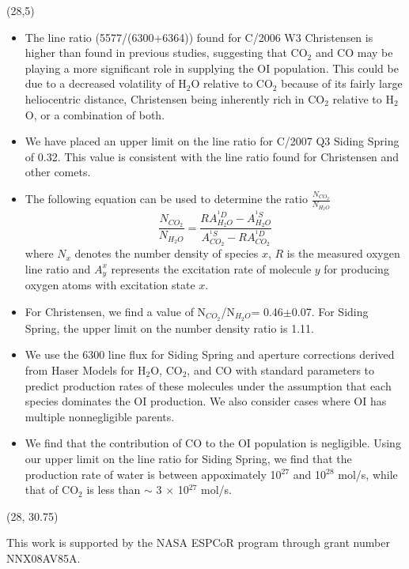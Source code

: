 \documentclass[a0]{a0poster}
\def\SecTitle#1{\noindent{\veryHuge\color{Green} #1}}
\begin{document}
\begin{textblock}{12}(28,5)
\center
\SecTitle{Results}\\
\bigskip
\raggedright
\normalsize
{
\begin{itemize}
\item The line ratio (5577/(6300+6364)) found for C/2006 W3 Christensen is higher than found in previous studies, suggesting that CO$_2$ and CO may be playing a more significant role in supplying the OI population.  This could be due to a decreased volatility of H$_2$O relative to CO$_2$ because of its fairly large heliocentric distance, Christensen being inherently rich in CO$_2$ relative to H$_2$O, or a combination of both.
\item We have placed an upper limit on the line ratio for C/2007 Q3 Siding Spring of 0.32.  This value is consistent with the line ratio found for Christensen and other comets.
\item The following equation can be used to determine the ratio $\frac{N_{CO_2}}{N_{H_2O}}$
\begin{equation}
\frac{N_{CO_2}}{N_{H_2O}} = \frac{RA^{^1D}_{H_2O}-A^{^1S}_{H_2O}}{A^{^1S}_{CO_2}-RA^{^1D}_{CO_2}}
\end{equation}
where $N_x$ denotes the number density of species $x$, $R$ is the measured oxygen line ratio and $A^x_y$ represents the excitation rate of molecule $y$ for producing oxygen atoms with excitation state $x$.
\item For Christensen, we find a value of N$_{CO_2}$/N$_{H_2O}$= 0.46$\pm$0.07.  For Siding Spring, the upper limit on the number density ratio is 1.11.\\
\item We use the 6300 line flux for Siding Spring and aperture corrections derived from Haser Models for H$_2$O, CO$_2$, and CO with standard parameters to predict production rates of these molecules under the assumption that each species dominates the OI production.  We also consider cases where OI has multiple nonnegligible parents. 
\item We find that the contribution of CO to the OI population is negligible.  Using our upper limit on the line ratio for Siding Spring, we find that the production rate of water is between appoximately 10$^{27}$ and 10$^{28}$ mol/s, while that of CO$_2$ is less than $\sim$ 3 $\times$ 10$^{27}$ mol/s.
\end{itemize}
}
\end{textblock}

\begin{textblock}{12}(28, 30.75)
\center
\SecTitle{Acknowledgments}\\
\bigskip
\raggedright
\normalsize
{
This work is supported by the NASA ESPCoR program through grant number NNX08AV85A.
}
\end{textblock}
\end{document}
